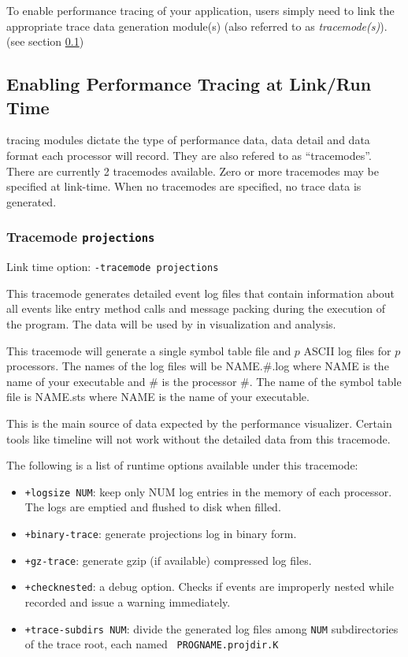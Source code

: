 To enable performance tracing of your application, users simply need
to link the appropriate trace data generation module(s) (also referred
to as {\em tracemode(s)}). (see section \ref{sec::trace modules})

\subsection{Enabling Performance Tracing at Link/Run Time}
\label{sec::trace modules}

\projections{} tracing modules dictate the type of performance data,
data detail and data format each processor will record. They are also
refered to as ``tracemodes''. There are currently 2 tracemodes
available. Zero or more tracemodes may be specified at link-time. When
no tracemodes are specified, no trace data is generated.

\subsubsection{Tracemode {\tt projections}}

Link time option: {\tt -tracemode projections}

This tracemode generates detailed event log files that contain
information about all \charmpp{} events like entry method calls and
message packing during the execution of the program.  The data will be
used by \projections{} in visualization and analysis.

This tracemode will generate a single symbol table file and $p$ ASCII
log files for $p$ processors. The names of the log files will be
NAME.\#.log where NAME is the name of your executable and \# is the
processor \#. The name of the symbol table file is NAME.sts where NAME
is the name of your executable.

This is the main source of data expected by the performance
visualizer. Certain tools like timeline will not work without the
detailed data from this tracemode.

The following is a list of runtime options available under this tracemode:

\begin{itemize}
\item
{\tt +logsize NUM}: keep only NUM log entries in the memory of each
processor. The logs are emptied and flushed to disk when filled.
\item
{\tt +binary-trace}:  generate projections log in binary form.
\item
{\tt +gz-trace}:      generate gzip (if available) compressed log files.
\item
{\tt +checknested}: a debug option. Checks if events are improperly nested
while recorded and issue a warning immediately.

\item {\tt +trace-subdirs NUM}: divide the generated log files among
  {\tt NUM} subdirectories of the trace root, each named {\tt
    PROGNAME.projdir.K}
\end{itemize}

